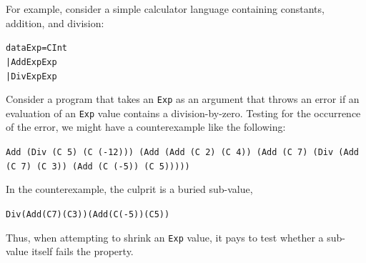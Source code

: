 \documentclass{sigplanconf}
\newenvironment{code}{\begin{alltt}}{\end{alltt}}
\newcommand{\ttp}[1]{\texttt{#1}}
\begin{document}
For example, consider a simple calculator language containing constants,
addition, and division:
%
\begin{code}
data Exp = C Int
         | Add Exp Exp
         | Div Exp Exp
\end{code}
%
\noindent
Consider a program that takes an \ttp{Exp} as an argument that throws an error
if an evaluation of an \ttp{Exp} value contains a division-by-zero.  Testing for
the occurrence of the error, we might have a counterexample like the following:
%
\medskip%
\begin{sloppypar}
\small
\noindent%
\ttp{Add (Div (C 5) (C (-12))) (Add (Add (C 2) (C 4)) (Add (C 7) (Div (Add (C 7)
  (C 3)) (Add (C (-5)) (C 5)))))}
\end{sloppypar}
\medskip%
\noindent
In the counterexample, the culprit is a buried sub-value,
%
\begin{code}
Div (Add (C 7) (C 3)) (Add (C (-5)) (C 5))
\end{code}
%
Thus, when attempting to shrink an \ttp{Exp} value, it pays to test whether a
sub-value itself fails the property.

\end{document}
